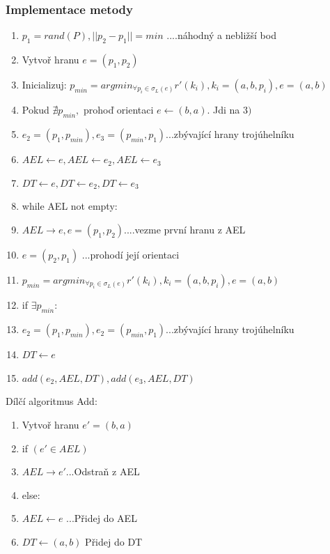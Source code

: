 \documentclass[a4paper, 12pt]{article}
\begin{document}
\subsubsection{Implementace metody}
\begin{enumerate}
\item $ p_1 = rand(P), ||p_2-p_1|| = min $ ....náhodný a nebližší bod
\item Vytvoř hranu $ e = (p_1,p_2) $ 
\item Inicializuj: $p_{min} = arg min_{\forall p_i\in\sigma_L(e)} r'(k_i), k_i = (a, b, p_i), e = (a,b)$
\item Pokud $ \nexists p_{min},$ prohoď orientaci $e \longleftarrow (b,a) $. Jdi na $3)$
\item $e_2 = (p_1,p_{min}), e_3 = (p_{min},p_1) $...zbývající hrany trojúhelníku
\item $AEL \longleftarrow e, AEL \longleftarrow e_2, AEL \longleftarrow e_3 $
\item $DT \longleftarrow e, DT \longleftarrow e_2, DT \longleftarrow e_3 $ 
\item while AEL not empty:
\item \hspace {1cm} $AEL  \longrightarrow e, e = (p_1, p_2) $....vezme první hranu z AEL
\item \hspace {1cm}$ e = (p_2, p_1)$ ...prohodí její orientaci
\item \hspace {1cm} $p_{min} = arg min_{\forall p_i\in\sigma_L(e)} r'(k_i), k_i = (a, b, p_i), e = (a,b) $
\item \hspace {1cm} if $ \exists p_{min}:$
\item \hspace {2cm} $e_2 = (p_1,p_{min}), e_2 = (p_{min},p_1) $...zbývající hrany trojúhelníku
\item \hspace {2cm} $DT \longleftarrow e  $  
\item \hspace {2cm} $ add(e_2,AEL,DT), add(e_3,AEL,DT)$
\end{enumerate}

Dílčí algoritmus Add:
\begin{enumerate}
	\item Vytvoř hranu $e' = (b,a)$
	\item if $(e' \in AEL)$
	\item \hspace {1cm} $ AEL \longrightarrow e'$...Odstraň z AEL
	\item else:
	\item \hspace {1cm} $ AEL \longleftarrow e$ ...Přidej do AEL
	\item $DT\longleftarrow (a,b)$ Přidej do DT
\end{enumerate}
\end{document}
